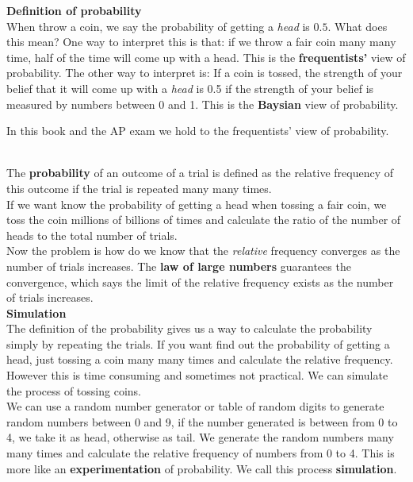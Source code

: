 \documentclass[a4paper, 12pt,twoside]{book}
\begin{document}
\textbf{Definition of probability}
\vspace{0.3cm}\\
When throw a coin, we say the probability of getting a \textit{head} is $0.5$. What does this mean? One way to interpret this is that: if we throw a fair coin many many time, half of the time will come up with a head. This is the \textbf{frequentists'} view of probability. The other way to interpret is: If a coin is tossed, the strength of your belief that it will come up with a \textit{head} is 0.5 if the strength of your belief is measured by numbers between 0 and 1. This is the \textbf{Baysian} view of probability.
\vspace{0.6cm}\\
\colorbox{babypink}{\parbox{\textwidth}{
 In this book and the AP exam we hold to the frequentists' view of probability.
}}
\vspace{0.3cm}\\
The \textbf{probability} of an outcome of a trial is defined as the relative frequency of this outcome if the trial is repeated many many times. 
\vspace{0.3cm}\\
If we want know the probability of getting a head when tossing a fair coin, we toss the coin millions of billions of times and calculate the ratio of the number of heads to the total number of trials.
\vspace{0.3cm}\\
Now the problem is how do we know that the \textit{relative} frequency converges as the number of trials increases. The \textbf{law of large numbers} guarantees the convergence, which says the limit of the relative frequency exists as the number of trials increases.
\vspace{0.6cm}\\
\textbf{Simulation}
\vspace{0.3cm}\\
The definition of the probability gives us a way to calculate the probability simply by repeating the trials. If you want find out the probability of getting a head, just tossing a coin many many times and calculate the relative frequency. However this is time consuming and sometimes not practical. We can simulate the process of tossing coins.
\vspace{0.3cm}\\
We can use a random number generator or table of random digits to generate random numbers between 0 and 9, if the number generated is between from 0 to 4, we take it as head, otherwise as tail. We generate the random numbers many many times and calculate the relative frequency of numbers from 0 to 4. This is more like an \textbf{experimentation} of probability. We call this process \textbf{simulation}.
\vspace{0.3cm}\\
\newpage
\end{document}
